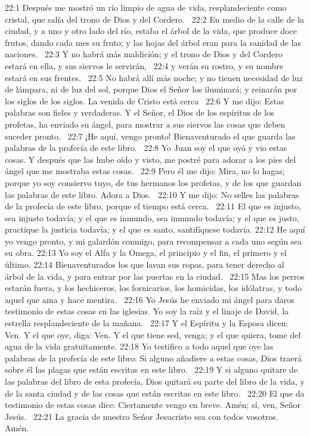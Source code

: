 22:1 Después me mostró un río limpio de agua de vida, resplandeciente como cristal, que salía del trono de Dios y del Cordero.  
22:2 En medio de la calle de la ciudad, y a uno y otro lado del río, estaba el árbol de la vida, que produce doce frutos, dando cada mes su fruto; y las hojas del árbol eran para la sanidad de las naciones.  
22:3 Y no habrá más maldición; y el trono de Dios y del Cordero estará en ella, y sus siervos le servirán,  
22:4 y verán su rostro, y su nombre estará en sus frentes.  
22:5 No habrá allí más noche; y no tienen necesidad de luz de lámpara, ni de luz del sol, porque Dios el Señor los iluminará; y reinarán por los siglos de los siglos. 
La venida de Cristo está cerca  
22:6 Y me dijo: Estas palabras son fieles y verdaderas. Y el Señor, el Dios de los espíritus de los profetas, ha enviado su ángel, para mostrar a sus siervos las cosas que deben suceder pronto.  
22:7 ¡He aquí, vengo pronto! Bienaventurado el que guarda las palabras de la profecía de este libro.  
22:8 Yo Juan soy el que oyó y vio estas cosas. Y después que las hube oído y visto, me postré para adorar a los pies del ángel que me mostraba estas cosas.  
22:9 Pero él me dijo: Mira, no lo hagas; porque yo soy consiervo tuyo, de tus hermanos los profetas, y de los que guardan las palabras de este libro. Adora a Dios.  
22:10 Y me dijo: No selles las palabras de la profecía de este libro, porque el tiempo está cerca.  
22:11 El que es injusto, sea injusto todavía; y el que es inmundo, sea inmundo todavía; y el que es justo, practique la justicia todavía; y el que es santo, santifíquese todavía. 
22:12 He aquí yo vengo pronto, y mi galardón conmigo, para recompensar a cada uno según sea su obra. 
22:13 Yo soy el Alfa y la Omega, el principio y el fin, el primero y el último. 
22:14 Bienaventurados los que lavan sus ropas, para tener derecho al árbol de la vida, y para entrar por las puertas en la ciudad.  
22:15 Mas los perros estarán fuera, y los hechiceros, los fornicarios, los homicidas, los idólatras, y todo aquel que ama y hace mentira.  
22:16 Yo Jesús he enviado mi ángel para daros testimonio de estas cosas en las iglesias. Yo soy la raíz y el linaje de David, la estrella resplandeciente de la mañana.  
22:17 Y el Espíritu y la Esposa dicen: Ven. Y el que oye, diga: Ven. Y el que tiene sed, venga; y el que quiera, tome del agua de la vida gratuitamente. 
22:18 Yo testifico a todo aquel que oye las palabras de la profecía de este libro: Si alguno añadiere a estas cosas, Dios traerá sobre él las plagas que están escritas en este libro.  
22:19 Y si alguno quitare de las palabras del libro de esta profecía, Dios quitará su parte del libro de la vida, y de la santa ciudad y de las cosas que están escritas en este libro.  
22:20 El que da testimonio de estas cosas dice: Ciertamente vengo en breve. Amén; sí, ven, Señor Jesús.  
22:21 La gracia de nuestro Señor Jesucristo sea con todos vosotros. Amén.  